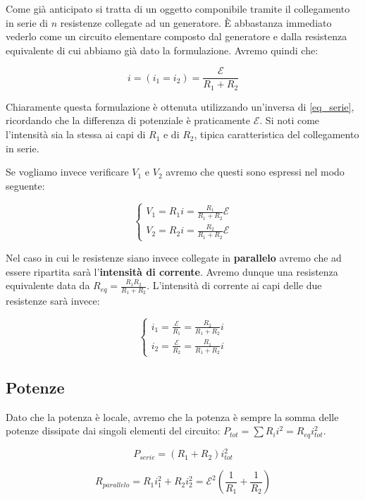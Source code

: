 Come già anticipato si tratta di un oggetto componibile tramite il collegamento in serie di $n$ resistenze collegate ad un generatore. È abbastanza immediato vederlo come un circuito elementare composto dal generatore e dalla resistenza equivalente di cui abbiamo già dato la formulazione. Avremo quindi che: 

$$
i = (i_1 = i_2) = \frac{\mathcal{E}}{R_1 + R_2} 
$$

Chiaramente questa formulazione è ottenuta utilizzando un'inversa di  \ref{eq_serie}, ricordando che la differenza di potenziale è praticamente $\mathcal{E}$. 
Si noti come l'intensità sia la stessa ai capi di $R_1$ e di $R_2$, tipica caratteristica del collegamento in serie. 


Se vogliamo invece verificare $V_1$ e $V_2$ avremo che questi sono espressi nel modo seguente: 

$$
\begin{cases}
	V_1 = R_1 i = \frac{R_1}{R_1 + R_2} \mathcal{E} \\
	V_2 = R_2 i = \frac{R_2}{R_1 + R_2} \mathcal{E}
\end{cases}
$$

Nel caso in cui le resistenze siano invece collegate in \textbf{parallelo} avremo che ad essere ripartita sarà l'\textbf{intensità di corrente}. Avremo dunque una resistenza equivalente data da $R_{eq} = \frac{R_1R_2}{R_1 + R_2}$. L'intensità di corrente ai capi delle due resistenze sarà invece: 

$$
	\begin{cases}
		i_1 = \frac{\mathcal{E}}{R_1} = \frac{R_2}{R_1 + R_2} i \\
		i_2 = \frac{\mathcal{E}}{R_2} = \frac{R_1}{R_1 + R_2} i
	\end{cases}
$$

\subsection{Potenze}
Dato che la potenza è locale, avremo che la potenza è sempre la somma delle potenze dissipate dai singoli elementi del circuito: $P_{tot} = \sum R_i i^2 = R_{eq}i_{tot}^2$. 

\begin{equation}
	P_{serie} = (R_1 + R_2) i^2_{tot}
\end{equation}

\begin{equation}
	R_{parallelo} =  R_1i_1^2 + R_2i_2^2 = \mathcal{E}^2 \left(\frac{1}{R_1} + \frac{1}{R_2}\right)
\end{equation}

